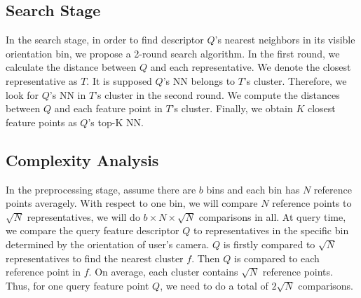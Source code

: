\subsection{Search Stage}
In the search stage, in order to find descriptor $Q$'s nearest neighbors in its visible orientation bin, we propose a 2-round search algorithm. In the first round, we calculate the distance between $Q$ and each representative. We denote the closest representative as $T$.
It is supposed $Q$'s NN belongs to $T$'s cluster. Therefore, we look for $Q$'s NN in $T$'s cluster in the second round. We compute the distances between $Q$ and each feature point in $T$'s cluster. Finally, we obtain $K$ closest feature points as $Q$'s top-K NN.
\subsection{Complexity Analysis}
\label{complexity}
In the preprocessing stage, assume there are $b$ bins and each bin has $N$ reference points averagely. With respect to one bin, we will compare $N$ reference points to $\sqrt{N}$ representatives, \ie we will do $b\times N\times \sqrt{N}$ comparisons in all. At query time, we compare the query feature descriptor $Q$ to representatives in the specific bin determined by the orientation of user's camera. $Q$ is firstly compared to $\sqrt{N}$ representatives to find the nearest cluster $f$. Then $Q$ is compared to each reference point in $f$. On average, each cluster contains $\sqrt{N}$ reference points. Thus, for one query feature point $Q$, we need to do a total of $2\sqrt{N}$ comparisons.
